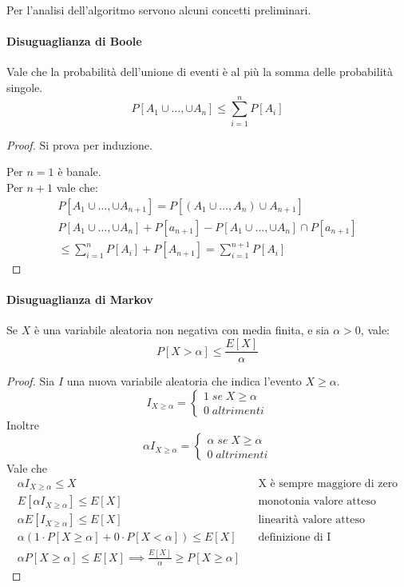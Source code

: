 Per l'analisi dell'algoritmo servono alcuni concetti preliminari.

\paragraph{Disuguaglianza di Boole}
Vale che la probabilità dell'unione di eventi è al più la somma delle probabilità singole.
$$P[A_1 \cup \dots, \cup A_n] \leq \sum_{i =1}^{n}P[A_i]$$
\begin{proof}
    Si prova per induzione.
    
    Per $n=1$ è banale.\\
    Per $n+1$ vale che:
    \begin{equation}
        \begin{aligned}
            P[A_1 \cup \dots, \cup A_{n+1}] = P[(A_1 \cup \dots, A_n)\cup A_{n+1}]\\
            P[A_1 \cup \dots, \cup A_n] + P[a_{n+1}] - P[A_1 \cup \dots, \cup A_n] \cap P[a_{n+1}]\\
            \leq \sum_{i =1}^{n}P[A_i] + P[A_{n+1}] = \sum_{i =1}^{n+1}P[A_i]
        \end{aligned}
    \end{equation}
\end{proof}

\paragraph{Disuguaglianza di Markov}
Se $X$ è una variabile aleatoria non negativa con media finita, e sia $\alpha > 0$, vale:
$$P[X > \alpha] \leq \frac{E[X]}{\alpha}$$
\begin{proof}
    Sia $I$ una nuova variabile aleatoria che indica l'evento $X \geq \alpha$.
    \[
        I_{X \geq \alpha} = 
        \begin{cases}
            1 \; \mathit{se}\; X \geq \alpha\\
            0 \; \mathit{altrimenti}
        \end{cases}\]
    Inoltre
    \[
        \alpha I_{X \geq \alpha} = 
        \begin{cases}
            \alpha \; \mathit{se}\; X \geq \alpha\\
            0 \; \mathit{altrimenti}
        \end{cases}\]
    Vale che
    \begin{equation}
        \begin{aligned}
            \alpha I_{X \geq \alpha} \leq X && \text{X è sempre maggiore di zero}\\
             E[\alpha I_{X \geq \alpha}] \leq E[X] && \text{monotonia valore atteso}\\
             \alpha E[ I_{X \geq \alpha}] \leq E[X] && \text{linearità valore atteso}\\
             \alpha (1\cdot P[X\geq \alpha] + 0\cdot P[X< \alpha]) \leq E[X] && \text{definizione di I}\\
             \alpha P[X\geq \alpha]\leq E[X] \implies \frac{E[X]}{\alpha} \geq P[X\geq \alpha]
        \end{aligned}
    \end{equation}
\end{proof}

